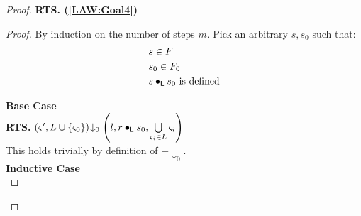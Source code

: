 \begin{lemma}[]
\begin{proof}
%
\noindent\textbf{RTS. (\ref{LAW:Goal4})}\\
\begin{proof}
By induction on the number of steps $m$. Pick an arbitrary $s, s_0$ such that:
%
\begin{align}
	&s \in F \label{LAW2:Ass1}\\
	& s_0 \in F_0 \label{LAW2:Ass2}\\
	& s \bullet_{\textsf{L}} s_0 \text{ is defined} \label{LAW2:Ass3} 
\end{align}

\noindent\textbf{Base Case}\\
\textbf{RTS. } $\left(\varsigma_{}', L \cup \{\varsigma_{0}\}\right) \!\downarrow_{0} \left(l, r \bullet_{\textsf{L}} s_0, \bigcup\limits_{\varsigma_{i} \in L} \varsigma_{i}\right)$\\
This holds trivially by definition of $-\downarrow_{0}$.\\

\noindent\textbf{Inductive Case}\\


\end{proof}
\end{proof}
\end{lemma}
